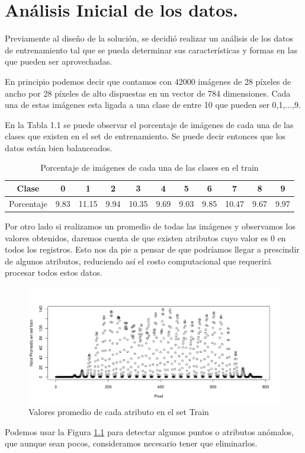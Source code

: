 \chapter{Análisis Inicial de los datos.}
Previamente al diseño de la solución, se decidió realizar un análisis de los datos de entrenamiento tal que se pueda determinar sus características y formas en las que pueden ser aprovechadas.

En principio podemos decir que contamos con 42000 imágenes de 28 píxeles de ancho por 28 píxeles de alto dispuestas en un vector de 784 dimensiones. Cada una de estas imágenes esta ligada a una clase de entre 10 que pueden ser 0,1,...,9. 

En la Tabla 1.1 se puede observar el porcentaje de imágenes de cada una de las clases que existen en el set de entrenamiento. Se puede decir entonces que los datos están bien balanceados.

\begin{table}[htp]
  \caption{Porcentaje de imágenes de cada una de las clases en el train}
  \label{porc}

  \begin{center}
    \begin{tabular}{|c|c|c|c|c|c|c|c|c|c|c|}
    \hline
      Clase&0&1&2&3&4&5&6&7&8&9 \\
    \hline
      Porcentaje&9.83&11.15&9.94&10.35&9.69&9.03&9.85&10.47&9.67&9.97 \\
    \hline
    \end{tabular}
  \end{center}
\end{table}

Por otro lado si realizamos un promedio de todas las imágenes y observamos los valores obtenidos, daremos cuenta de que existen atributos cuyo valor es 0 en todos los registros. Esto nos da pie a pensar de que podríamos llegar a prescindir de algunos atributos, reduciendo así el costo computacional que requerirá procesar todos estos datos.
\begin{figure}[htp]
  \begin{center}
    \includegraphics[width=15cm]{Rplot.jpeg}
    \caption{Valores promedio de cada atributo en el set Train}
    \label{plot1}
  \end{center}
\end{figure}
Podemos usar la Figura \ref{plot1} para detectar algunos puntos o atributos anómalos, que aunque sean pocos, consideramos necesario tener que eliminarlos.

